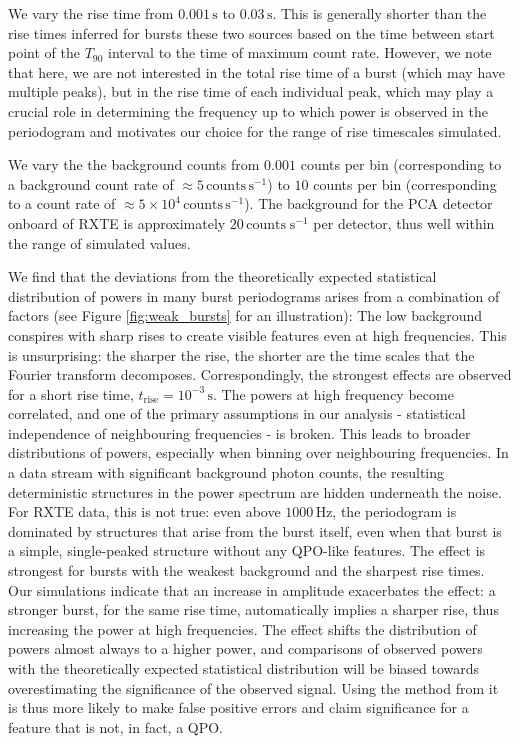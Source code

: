 \documentclass[numberedappendix]{emulateapj}
\newcommand{\hz}{\,\mathrm{Hz}}
\begin{document}
We vary the rise time from $0.001 \, \mathrm{s}$ to $0.03 \, \mathrm{s}$. This is generally shorter than the rise times inferred for bursts these two sources based on the time between start point of the $T_{90}$ interval to the time of maximum count rate. However, we note that here, we are not interested in the total rise time of a burst (which may have multiple peaks), but in the rise time of each individual peak, which may play a crucial role in determining the frequency up to which power is observed in the periodogram and motivates our choice for the range of rise timescales simulated. 

We vary the the background counts from $0.001$ counts per bin (corresponding to a background count rate of $\approx 5 \, \mathrm{counts}\, \mathrm{s}^{-1}$) to $10$ counts per bin (corresponding to a count rate of $\approx 5 \times 10^{4}\, \mathrm{counts}\, \mathrm{s}^{-1}$). The background for the PCA detector onboard of RXTE is approximately $20\, \mathrm{counts}\; \mathrm{s}^{-1}$ per detector, thus well within the range of simulated values.


We find that the deviations from the theoretically expected statistical distribution of powers in many burst periodograms arises from a combination of factors (see Figure \ref{fig:weak_bursts} for an illustration): The low background conspires with sharp rises to create visible features even at high frequencies. This is unsurprising: the sharper the rise, the shorter are the time scales that the Fourier transform decomposes. Correspondingly, the strongest effects are observed for a short rise time, $t_{\mathrm{rise}} = 10^{-3}\,\mathrm{s}$. The powers at high frequency become correlated, and one of the primary assumptions in our analysis - statistical independence of neighbouring frequencies - is broken. This leads to broader distributions of powers, especially when binning over neighbouring frequencies. In a data stream with significant background photon counts, the resulting deterministic structures in the power spectrum are hidden underneath the noise. For RXTE data, this is not true: even above $1000\hz$, the periodogram is dominated by structures that arise from the burst itself, even when that burst is a simple, single-peaked structure without any QPO-like features. The effect is strongest for bursts with the weakest background and the sharpest rise times. Our simulations indicate that an increase in amplitude exacerbates the effect: a stronger burst, for the same rise time, automatically implies a sharper rise, thus increasing the power at high frequencies. The effect shifts the distribution of powers almost always to a higher power, and comparisons of observed powers with the theoretically expected statistical distribution will be biased towards overestimating the significance of the observed signal. Using the method from \citet{huppenkothen2013} it is thus more likely to make false positive errors and claim significance for a feature that is not, in fact, a QPO.
\end{document}
